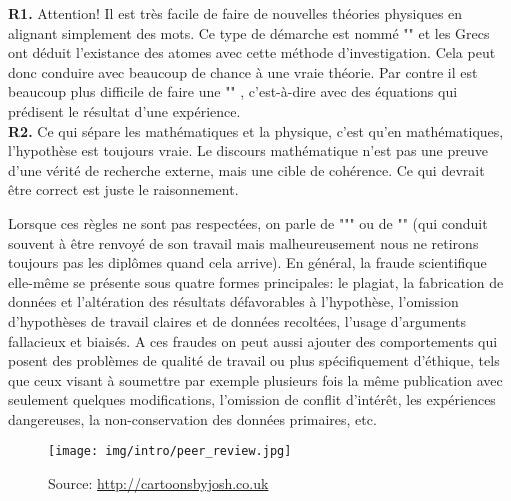 	\begin{tcolorbox}[title=Remarks,colframe=black,arc=10pt]
\textbf{R1.} Attention! Il est très facile de faire de nouvelles théories physiques en alignant simplement des mots. Ce type de démarche est nommé "" et les Grecs ont déduit l'existance des atomes avec cette méthode d'investigation. Cela peut donc conduire avec beaucoup de chance à une vraie théorie. Par contre il est beaucoup plus difficile de faire une "" , c'est-à-dire avec des équations qui prédisent le résultat d'une expérience.\\

\textbf{R2.} Ce qui sépare les mathématiques et la physique, c'est qu'en mathématiques, l'hypothèse est toujours vraie. Le discours mathématique n'est pas une preuve d'une vérité de recherche externe, mais une cible de cohérence. Ce qui devrait être correct est juste le raisonnement.
	\end{tcolorbox}
	Lorsque ces règles ne sont pas respectées, on parle de """ ou de "" (qui conduit souvent à être renvoyé de son travail mais malheureusement nous ne retirons toujours pas les diplômes quand cela arrive). En général, la fraude scientifique elle-même se présente sous quatre formes principales: le plagiat, la fabrication de données et l'altération des résultats défavorables à l'hypothèse, l'omission d'hypothèses de travail claires et de données recoltées, l'usage d'arguments fallacieux et biaisés. A ces fraudes on peut aussi ajouter des comportements qui posent des problèmes de qualité de travail ou plus spécifiquement d'éthique, tels que ceux visant à soumettre par exemple plusieurs fois la même publication avec seulement quelques modifications, l'omission de conflit d'intérêt, les expériences dangereuses, la non-conservation des données primaires, etc.
	\begin{figure}[H]
		\centering
		\texttt{[image: img/intro/peer\_review.jpg]}
		\caption[]{Source: \url{http://cartoonsbyjosh.co.uk}}
	\end{figure}	


